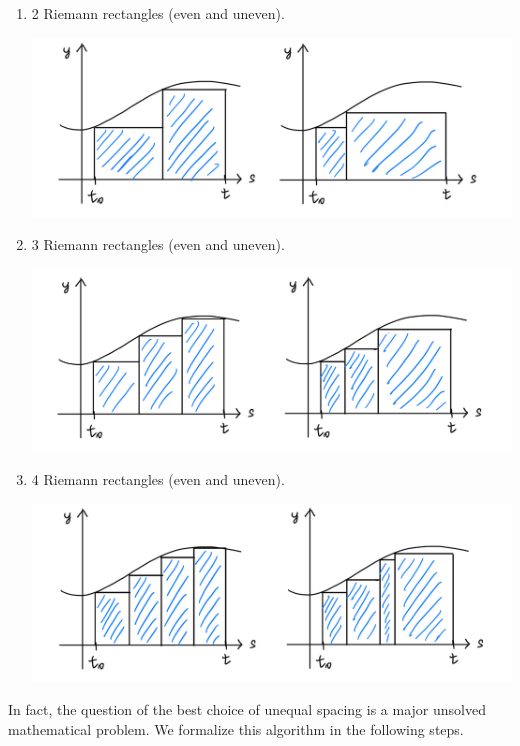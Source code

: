 \documentclass{article}
\theoremstyle{remark}
\theoremstyle{definition}
\begin{document}
\begin{enumerate}
    \item 2 Riemann rectangles (even and uneven). 
    \begin{center}
        \includegraphics[scale=0.25]{img/2_Riemann.PNG}
    \end{center}
    \item 3 Riemann rectangles (even and uneven). 
    \begin{center}
        \includegraphics[scale=0.25]{img/3_Riemann.PNG}
    \end{center}
    \item 4 Riemann rectangles (even and uneven). 
    \begin{center}
        \includegraphics[scale=0.25]{img/4_Riemann.PNG}
    \end{center}
\end{enumerate}
In fact, the question of the best choice of unequal spacing is a major unsolved mathematical problem. We formalize this algorithm in the following steps. 
\end{document}

